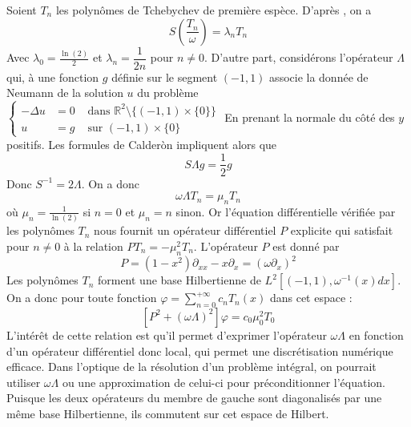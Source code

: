 \documentclass[11pt,a4paper]{article}
\begin{document}
Soient $T_n$ les polynômes de Tchebychev de première espèce. 
D'après \cite{bruno2012second}, on a 
\[ S \left(\dfrac{T_n}{\omega}\right) = \lambda_n T_n\]
Avec $\lambda_0 = \frac{\ln(2)}{2}$ et $\lambda_n = \dfrac{1}{2n}$ pour $n\neq 0$. D'autre part, considérons l'opérateur $\Lambda$ qui, à une fonction $g$ définie sur le segment $(-1,1)$ associe la donnée de Neumann de la solution $u$ du problème 
$\left\{\begin{array}{rll}
-\Delta u &= 0 & \text{ dans } \mathbb{R}^2 \setminus \{(-1,1)\times \{0\}\}\\
u &= g & \text{ sur } (-1,1)\times\{0\}
\end{array}\right.$
En prenant la normale du côté des $y$ positifs. Les formules de Calderòn impliquent alors que 
\[S\Lambda g = \frac{1}{2}g\]
Donc $S^{-1} = 2\Lambda$. On a donc 
\[ \omega\Lambda T_n = \mu_n T_n \]
où $\mu_n = \frac{1}{\ln(2)}$ si $n=0$ et $\mu_n = n$ sinon. Or l'équation différentielle vérifiée par les polynômes $T_n$ nous fournit un opérateur différentiel $P$ explicite qui satisfait pour $n \neq 0$ à la relation $PT_n = -\mu_n^2 T_n$. L'opérateur $P$ est donné par  \[ P = (1-x^2) \partial_{xx} - x\partial_x = \left(\omega \partial_x\right)^2\] 
Les polynômes $T_n$ forment une base Hilbertienne de $L^2\left[(-1,1),\omega^{-1}(x)dx\right]$. On a donc pour toute fonction $\varphi = \sum_{n=0}^{+\infty}c_n T_n(x)$ dans cet espace : 
\[\left[P^2 + (\omega\Lambda)^2\right] \varphi = c_0\mu_0^2 T_0 \]
L'intérêt de cette relation est qu'il permet d'exprimer l'opérateur $\omega\Lambda$ en fonction d'un opérateur différentiel donc local, qui permet une discrétisation numérique efficace. Dans l'optique de la résolution d'un problème intégral, on pourrait utiliser $\omega\Lambda$ ou une approximation de celui-ci pour préconditionner l'équation. 
Puisque les deux opérateurs du membre de gauche sont diagonalisés par une même base Hilbertienne, ils commutent sur cet espace de Hilbert. 





































  
\end{document}
